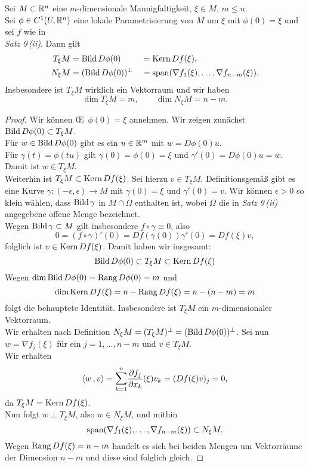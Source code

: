 \documentclass[skript.tex]{subfiles}
\begin{document}
	\begin{theorem}
		Sei $M\subset{\mathbb{R}^n}$ eine $m$-dimensionale Mannigfaltigkeit, $\xi \in M$, $m \leq n$.\\
		Sei $\phi \in C^1(U,{\mathbb{R}^n})$ eine lokale Parametrisierung von $M$ um $\xi$ mit $\phi(0)=\xi$ und sei $f$ wie in \\ \emph{Satz 9\,(ii)}.
		Dann gilt
		\begin{alignat*}{2}
			T_\xi M &= \operatorname{Bild} D\phi(0) &&=\operatorname{Kern} Df(\xi),\\
			N_\xi M &= (\operatorname{Bild} D\phi(0))^\perp &&=\operatorname{span}(\nabla f_1(\xi),\dotsc,\nabla f_{n-m}(\xi)).
		\end{alignat*}
		Insbesondere ist $T_\xi M$ wirklich ein Vektorraum und wir haben
		\[
			\dim T_\xi M = m, \qquad \dim N_\xi M = n-m.
		\]
	\end{theorem}
	\begin{proof}
		Wir können \OE\ $\phi(0) = \xi$ annehmen.
		Wir zeigen zunächst $\operatorname{Bild} D\phi(0) \subset T_\xi M$.\\
		Für $w\in\operatorname{Bild} D\phi(0)$ gibt es ein
		$u\in\mathbb{R}^m$ mit $w=D\phi(0)u$.\\
		Für $\gamma(t)=\phi(tu)$ gilt $\gamma(0) = \phi(0) = \xi$ und $\gamma'(0) = D\phi(0)u=w$. Damit ist $w \in T_\xi M$.\\
		Weiterhin ist $T_\xi M \subset \operatorname{Kern} Df(\xi)$.
		Sei hierzu $v \in T_\xi M$. Definitionsgemäß gibt es eine
		Kurve $\gamma \colon (-\epsilon,\epsilon) \to M$ mit $\gamma(0)=\xi$ und $\gamma'(0)=v$. Wir können $\epsilon>0$ so klein wählen, dass $\operatorname{Bild}\gamma$ in $M\cap\Omega$ enthalten ist, wobei $\Omega$ die
		in \emph{Satz 9\,(ii)} angegebene offene Menge bezeichnet.\\
		Wegen $\operatorname{Bild}\gamma \subset M$ gilt insbesondere
		$f\circ\gamma\equiv0$, also
		\[
			0 = (f\circ\gamma)'(0) = Df(\gamma(0))\gamma'(0) = Df(\xi)v,
		\]
		folglich ist $v \in \operatorname{Kern} Df(\xi)$. Damit haben wir insgesamt:
		\[
			\operatorname{Bild} D\phi(0) \subset T_\xi M \subset \operatorname{Kern} Df(\xi)
		\]
		Wegen $\dim\operatorname{Bild} D\phi(0) = \operatorname{\operatorname{Rang}} D\phi(0) = m$ und
		\[
			\dim\operatorname{Kern} Df(\xi) = n - \operatorname{\operatorname{Rang}} Df(\xi) = n-(n-m) = m
		\]
		folgt die behauptete Identität. Insbesondere ist $T_\xi M$ ein $m$-dimensionaler Vektorraum.\\
		Wir erhalten nach Definition $N_\xi M = (T_\xi M)^\perp
		= (\operatorname{Bild} D\phi(0))^\perp$.
		Sei nun $w = \nabla f_j(\xi)$ für ein $j=1,\dotsc,n-m$ und $v \in T_\xi M$.\\
		Wir erhalten
		\[
			\skp{w}{v} = \mathlarger\sum_{k=1}^n \ddel{f_j}{x_k}(\xi) v_k = (Df(\xi)v)_j = 0,
		\]
		da $T_\xi M = \operatorname{Kern} Df(\xi)$.\\
		Nun folgt $w \perp T_\xi M$, also $w \in N_\xi M$, und mithin
		\[
			\operatorname{span}(\nabla f_1(\xi),\dotsc,\nabla f_{n-m}(\xi)) \subset N_\xi M.
		\]
		Wegen $\operatorname{\operatorname{Rang}} Df(\xi) = n-m$ handelt es sich bei beiden Mengen um Vektorräume der Dimension $n-m$ und diese sind folglich gleich.
	\end{proof}
\end{document}
